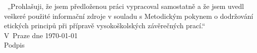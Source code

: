 \setcounter{page}{0} %
\pagestyle{empty} %
\newpage ~\vfill „Prohlašuji, že jsem předloženou práci vypracoval samostatně a že jsem uvedl
\mbox{veškeré} použité informační zdroje v souladu s Metodickým pokynem o
dodržování etických principů při přípravě vysokoškolských závěrečných prací.“\\[3em] V~Praze dne \today \hspace{.2\textwidth} \dotfill\\
\hspace*{11cm} Podpis
